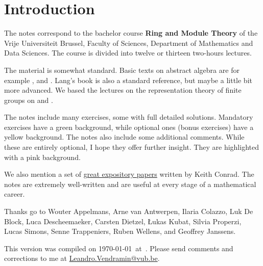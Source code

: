 \thispagestyle{plain}

\section*{Introduction}

The notes correspond to the bachelor 
course \textbf{Ring and Module Theory} of the 
Vrije Universiteit Brussel, 
Faculty of Sciences, 
Department of Mathematics and Data Sciences. The course
is divided into twelve or thirteen two-hours lectures. 

The material is somewhat standard. Basic texts on abstract algebra
are for example \cite{MR1129886}, \cite{MR2286236} and \cite{MR600654}. 
Lang's book \cite{MR783636} is also a standard reference, but 
maybe a little bit more advanced. 
We based the lectures on the representation theory of finite
groups on \cite{MR0450380} and 
\cite{MR2867444}. 

The notes include many exercises, some with full detailed solutions. Mandatory exercises have a \colorbox{green!5!white}{green background}, while optional ones (bonus exercises) have a \colorbox{yellow!15!white}{yellow background}.
The notes also include some additional comments. While these are entirely optional, I hope they offer further insight. They are highlighted with a \colorbox{red!5!white}{pink background}.


We also mention a set of \href{https://kconrad.math.uconn.edu/blurbs/}{great expository papers} written 
by Keith Conrad. 
The notes are extremely well-written and are useful at  
every stage of a mathematical career. 


Thanks go to Wouter Appelmans, Arne van Antwerpen, Ilaria Colazzo, Luk De Block, 
Luca Descheemaeker, Carsten Dietzel, {\L}ukas Kubat, Silvia Properzi, Lucas Simons, Senne Trappeniers, 
Ruben Wellens, and Geoffrey Janssens. 

This version 
was compiled on \today~at~\currenttime. 
Please send comments and corrections to me at \url{Leandro.Vendramin@vub.be}. 


